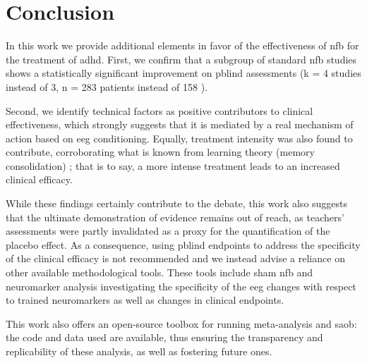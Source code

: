 

\section{Conclusion}

In this work we provide additional elements in favor of the effectiveness of \gls{nfb} for the treatment of \gls{adhd}. First, 
we confirm that a subgroup of standard \gls{nfb} studies shows a statistically significant improvement on \gls{pblind} 
assessments (k = 4 studies instead of 3, n = 283 patients instead of 158 \citet{Cortese2016}). 

Second, we identify technical factors as positive contributors to clinical effectiveness, which strongly suggests 
that it is mediated by a real mechanism of action based on \gls{eeg} conditioning. Equally, treatment intensity was also found to 
contribute, corroborating what is known from learning theory (memory consolidation) \citep{Mowrer1960}; that is to say, 
a more intense treatment leads to an increased clinical efficacy.

While these findings certainly contribute to the debate, this work also suggests that the ultimate demonstration of evidence 
remains out of reach, as teachers’ assessments were partly invalidated as a proxy for the quantification of the placebo effect. 
As a consequence, using \gls{pblind} endpoints to address the specificity of the clinical efficacy is not recommended 
and we instead advise a reliance on other available methodological tools. These tools include sham \gls{nfb} and neuromarker 
analysis investigating the specificity of the \gls{eeg} changes with respect to trained neuromarkers as well as changes 
in clinical endpoints.

This work also offers an open-source toolbox for running meta-analysis and \gls{saob}: the code and data used are available, 
thus ensuring the transparency and replicability of these analysis, as well as fostering future ones.

